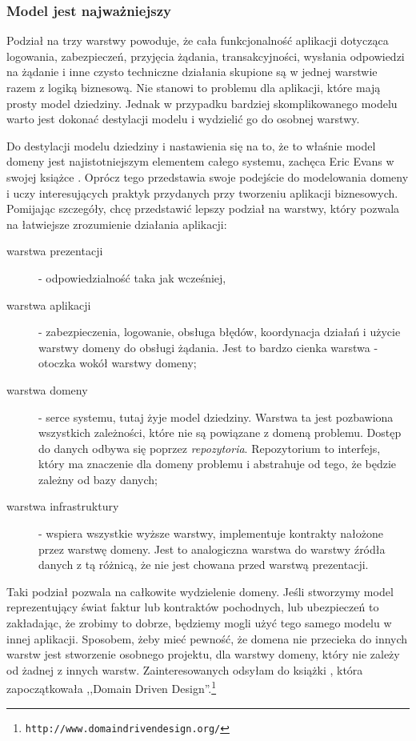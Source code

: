 \documentclass[a4paper,onecolumn,oneside,11pt,wide,floatssmall]{mwrep}
\def\url#1{{ \tt #1}}
\theoremstyle{definition}
\theoremstyle{plain}%
\theoremstyle{remark}
\begin{document}
\subsubsection{Model jest najważniejszy}
Podział na trzy warstwy powoduje, że cała funkcjonalność aplikacji dotycząca logowania, zabezpieczeń, przyjęcia 
żądania, transakcyjności, wysłania odpowiedzi na żądanie i inne czysto techniczne działania skupione są w jednej 
warstwie razem z logiką biznesową. Nie stanowi to problemu dla aplikacji, które mają prosty model dziedziny. Jednak w 
przypadku bardziej skomplikowanego modelu warto jest dokonać destylacji modelu i wydzielić go do osobnej warstwy. 

Do destylacji modelu dziedziny i nastawienia się na to, że to właśnie model domeny jest najistotniejszym elementem 
całego systemu, zachęca Eric Evans w swojej książce \cite{evans2004domain}. Oprócz tego przedstawia swoje podejście do 
modelowania domeny i uczy interesujących praktyk przydanych przy tworzeniu aplikacji biznesowych. Pomijając szczegóły,
chcę przedstawić lepszy podział na warstwy, który pozwala na łatwiejsze zrozumienie działania aplikacji:

\begin{description}
  \item[warstwa prezentacji] - odpowiedzialność taka jak wcześniej,
  \item[warstwa aplikacji] - zabezpieczenia, logowanie, obsługa błędów, koordynacja działań i użycie warstwy domeny do 
  obsługi żądania. Jest to bardzo cienka warstwa - otoczka wokół warstwy domeny;
  \item[warstwa domeny] - serce systemu, tutaj żyje model dziedziny. Warstwa ta jest pozbawiona wszystkich zależności, 
  które nie są powiązane z domeną problemu. Dostęp do danych odbywa się poprzez \emph{repozytoria}. Repozytorium to 
  interfejs, który ma znaczenie dla domeny problemu i abstrahuje od tego, że będzie zależny od bazy danych;
  \item[warstwa infrastruktury] - wspiera wszystkie wyższe warstwy, implementuje kontrakty nałożone przez warstwę 
  domeny. Jest to analogiczna warstwa do warstwy źródła danych z tą różnicą, że nie jest chowana przed warstwą 
  prezentacji.
\end{description}

Taki podział pozwala na całkowite wydzielenie domeny. Jeśli stworzymy model reprezentujący świat faktur lub kontraktów 
pochodnych, lub ubezpieczeń to zakładając, że zrobimy to dobrze, będziemy mogli użyć tego samego modelu w innej 
aplikacji. Sposobem, żeby mieć pewność, że domena nie przecieka do innych warstw jest stworzenie osobnego projektu, 
dla warstwy domeny, który nie zależy od żadnej z innych warstw. Zainteresowanych odsyłam do książki \cite{
evans2004domain}, która zapoczątkowała ,,Domain Driven Design''.\footnote{\url{http://www.domaindrivendesign.org/}}
\end{document}
